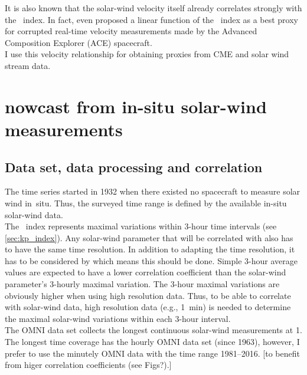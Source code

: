 It is also known that the solar-wind velocity itself already correlates strongly with the \Kp~index. In fact, \citet{Machol2013} even proposed a linear function of the \Kp~index as a best proxy for corrupted real-time velocity measurements made by the Advanced Composition Explorer (ACE) spacecraft.\\

I use this velocity relationship for obtaining \Kp{} proxies from CME and solar wind stream data.\\


\section{\Kp{} nowcast from in-situ solar-wind measurements}
\label{sec:kp_nowcast}

\subsection{Data set, data processing and correlation}
\label{sec:data_set__data_processing_and_correlation}
The \Kp{} time series started in 1932 when there existed no spacecraft to measure solar wind in~situ. Thus, the surveyed time range is defined by the available in-situ solar-wind data.\\

The \Kp{}~index represents maximal variations within 3-hour time intervals (see \autoref{sec:kp_index}). Any solar-wind parameter that will be correlated with \Kp{} also has to have the same time resolution. In addition to adapting the time resolution, it has to be considered by which means this should be done. Simple 3-hour average values are expected to have a lower correlation coefficient than the solar-wind parameter's 3-hourly maximal variation.
The 3-hour maximal variations are obviously higher when using high resolution data. Thus, to be able to correlate \Kp{} with solar-wind data, high resolution data (e.g., 1~min) is needed to determine the maximal solar-wind variations within each 3-hour interval.\\

The OMNI data set collects the longest continuous solar-wind measurements at \SI{1}{\au}. The longest time coverage has the hourly OMNI data set (since 1963), however, I prefer to use the minutely OMNI data with the time range 1981--2016. [to benefit from higer correlation coefficients (see Figs?).]\\


